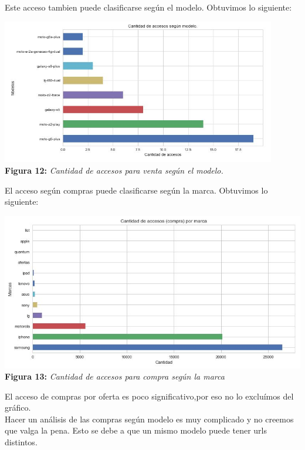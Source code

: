 \documentclass[titlepage,a4paper]{article}
\begin{document}
	Este acceso tambien puede clasificarse según el modelo. Obtuvimos lo siguiente:
	\begin{center}
	\includegraphics[width=12cm] {cantidadDeAccesosPorModelo.jpg}\\
	\textbf{Figura 12:}  \textit{Cantidad de accesos para venta según el modelo.}
	\end{center}
	El acceso según compras puede clasificarse según la marca. Obtuvimos lo siguiente:
	\begin{center}
	\includegraphics[width=15cm] {cantidadDeAccesosPorMarcaCompra.jpg}\\
	\textbf{Figura 13:}  \textit{Cantidad de accesos para compra según la marca}
	\end{center}
	El acceso de compras por oferta es poco significativo,por eso no lo excluímos del gráfico.\\
	Hacer un análisis de las compras según modelo es muy complicado y no creemos que valga la pena. Esto se debe a que un mismo modelo puede tener urls distintos. 
\end{document}
